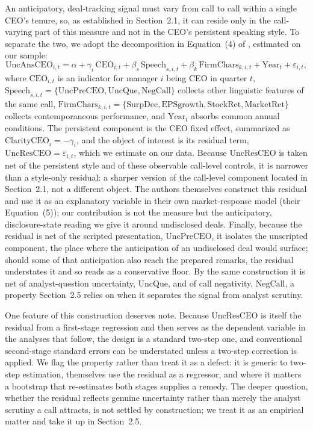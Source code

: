 An anticipatory, deal-tracking signal must vary from call to call within a single CEO's tenure, so, as established in Section~2.1, it can reside only in the call-varying part of this measure and not in the CEO's persistent speaking style. To separate the two, we adopt the decomposition in Equation~(4) of \citet{dwz}, estimated on our sample:
\begin{equation}
\mathrm{UncAnsCEO}_{i,t} = \alpha + \gamma_i\,\mathrm{CEO}_{i,t} + \beta_s\,\mathrm{Speech}_{s,i,t} + \beta_k\,\mathrm{FirmChars}_{k,i,t} + \mathrm{Year}_t + \varepsilon_{i,t},
\end{equation}
where $\mathrm{CEO}_{i,t}$ is an indicator for manager $i$ being CEO in quarter $t$, $\mathrm{Speech}_{s,i,t}=\{\mathrm{UncPreCEO},\mathrm{UncQue},\mathrm{NegCall}\}$ collects other linguistic features of the same call, $\mathrm{FirmChars}_{k,i,t}=\{\mathrm{SurpDec},\mathrm{EPSgrowth},\mathrm{StockRet},\mathrm{MarketRet}\}$ collects contemporaneous performance, and $\mathrm{Year}_t$ absorbs common annual conditions. The persistent component is the CEO fixed effect, summarized as $\mathrm{ClarityCEO}_i=-\gamma_i$, and the object of interest is its residual term, $\mathrm{UncResCEO}=\varepsilon_{i,t}$, which we estimate on our data. Because $\mathrm{UncResCEO}$ is taken net of the persistent style and of these observable call-level controls, it is narrower than a style-only residual: a sharper version of the call-level component located in Section~2.1, not a different object. The authors themselves construct this residual and use it as an explanatory variable in their own market-response model (their Equation~(5)); our contribution is not the measure but the anticipatory, disclosure-state reading we give it around undisclosed deals. Finally, because the residual is net of the scripted presentation, $\mathrm{UncPreCEO}$, it isolates the unscripted component, the place where the anticipation of an undisclosed deal would surface; should some of that anticipation also reach the prepared remarks, the residual understates it and so reads as a conservative floor. By the same construction it is net of analyst-question uncertainty, $\mathrm{UncQue}$, and of call negativity, $\mathrm{NegCall}$, a property Section~2.5 relies on when it separates the signal from analyst scrutiny.

One feature of this construction deserves note. Because $\mathrm{UncResCEO}$ is itself the residual from a first-stage regression and then serves as the dependent variable in the analyses that follow, the design is a standard two-step one, and conventional second-stage standard errors can be understated unless a two-step correction is applied. We flag the property rather than treat it as a defect: it is generic to two-step estimation, \citeauthor{dwz} themselves use the residual as a regressor, and where it matters a bootstrap that re-estimates both stages supplies a remedy. The deeper question, whether the residual reflects genuine uncertainty rather than merely the analyst scrutiny a call attracts, is not settled by construction; we treat it as an empirical matter and take it up in Section~2.5.
